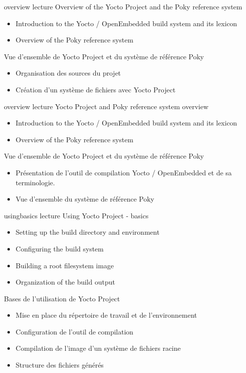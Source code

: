 {overview}
{lecture}
{Overview of the Yocto Project and the Poky reference system}
{
  \begin{itemize}
  \item Introduction to the Yocto / OpenEmbedded build system and its lexicon
  \item Overview of the Poky reference system
  \end{itemize}
}
{Vue d'ensemble de Yocto Project et du système de référence Poky}
{
  \begin{itemize}
  \item Organisation des sources du projet
  \item Création d'un système de fichiers avec Yocto Project
  \end{itemize}
}

{overview}
{lecture}
{Yocto Project and Poky reference system overview}
{
  \begin{itemize}
  \item Introduction to the Yocto / OpenEmbedded build system and its lexicon
  \item Overview of the Poky reference system
  \end{itemize}
}
{Vue d'ensemble de Yocto Project et du système de référence Poky}
{
  \begin{itemize}
  \item Présentation de l'outil de compilation Yocto / OpenEmbedded et de sa terminologie.
  \item Vue d'ensemble du système de référence Poky
  \end{itemize}
}

{usingbasics}
{lecture}
{Using Yocto Project - basics}
{
  \begin{itemize}
  \item Setting up the build directory and environment
  \item Configuring the build system
  \item Building a root filesystem image
  \item Organization of the build output
  \end{itemize}
}
{Bases de l'utilisation de Yocto Project}
{
  \begin{itemize}
  \item Mise en place du répertoire de travail et de l'environnement
  \item Configuration de l'outil de compilation
  \item Compilation de l'image d'un système de fichiers racine
  \item Structure des fichiers générés
  \end{itemize}
}

